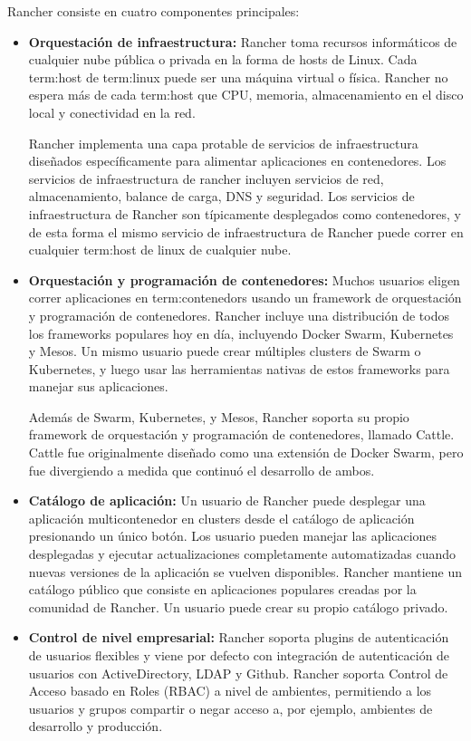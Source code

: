 Rancher consiste en cuatro componentes principales:

\begin{itemize}

  \item \textbf{Orquestación de infraestructura:}
    Rancher toma recursos informáticos de cualquier nube pública o privada en
    la forma de hosts de Linux. Cada \gls{term:host} de \gls{term:linux} puede ser una máquina
    virtual o física. Rancher no espera más de cada \gls{term:host} que CPU, memoria,
    almacenamiento en el disco local y conectividad en la red.

    Rancher implementa una capa protable de servicios de infraestructura
    diseñados específicamente para alimentar aplicaciones en contenedores. Los
    servicios de infraestructura de rancher incluyen servicios de red,
    almacenamiento, balance de carga, DNS y seguridad. Los servicios de
    infraestructura de Rancher son típicamente desplegados como contenedores, y
    de esta forma el mismo servicio de infraestructura de Rancher puede correr
    en cualquier \gls{term:host} de linux de cualquier nube.

  \item \textbf{Orquestación y programación de contenedores:}
    Muchos usuarios eligen correr aplicaciones en \glspl{term:contenedor} usando un
    framework de orquestación y programación de contenedores. Rancher incluye
    una distribución de todos los frameworks populares hoy en día, incluyendo
    Docker Swarm, Kubernetes y Mesos. Un mismo usuario puede crear múltiples
    clusters de Swarm o Kubernetes, y luego usar las herramientas nativas de
    estos frameworks para manejar sus aplicaciones.

    Además de Swarm, Kubernetes, y Mesos, Rancher soporta su propio framework
    de orquestación y programación de contenedores, llamado Cattle. Cattle fue
    originalmente diseñado como una extensión de Docker Swarm, pero fue
    divergiendo a medida que continuó el desarrollo de ambos.

  \item \textbf{Catálogo de aplicación:}
    Un usuario de Rancher puede desplegar una aplicación multicontenedor en
    clusters desde el catálogo de aplicación presionando un único botón. Los
    usuario pueden manejar las aplicaciones desplegadas y ejecutar
    actualizaciones completamente automatizadas cuando nuevas versiones de la
    aplicación se vuelven disponibles. Rancher mantiene un catálogo público que
    consiste en aplicaciones populares creadas por la comunidad de Rancher. Un
    usuario puede crear su propio catálogo privado.

  \item \textbf{Control de nivel empresarial:}
    Rancher soporta plugins de autenticación de usuarios flexibles y viene por
    defecto con integración de autenticación de usuarios con ActiveDirectory,
    LDAP y Github. Rancher soporta Control de Acceso basado en Roles (RBAC) a
    nivel de ambientes, permitiendo a los usuarios y grupos compartir o negar
    acceso a, por ejemplo, ambientes de desarrollo y producción.

\end{itemize}

\clearpage
